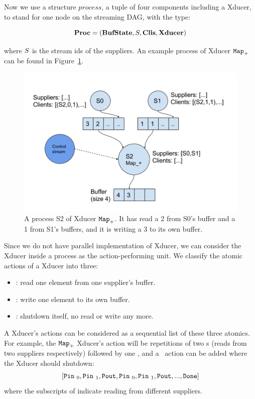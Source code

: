 Now we use a structure $process$, a tuple of four components including a Xducer, to stand for one node on the streaming DAG, with the type:

$$ \proc  =  (\bufst, \S, \clis, \xducer) $$

where $\S$ is the stream ids of the suppliers. An example process of Xducer $\map{+}$ can be found in Figure~\ref{fig:process}.

\begin{figure}
	\centering
	\includegraphics[width=1.0\textwidth]{process2}
	\caption{A process S2 of Xducer $\map{+}$. It has read a 2 from S0's buffer and a 1 from S1's buffers, and it is writing a 3 to its own buffer.}
	\label{fig:process}
\end{figure}

Since we do not have parallel implementation of Xducer, we can consider the Xducer inside a process as the action-performing unit. 
We classify the atomic actions of a Xducer into three:
\begin{itemize}
	\item \pin: read one element from one supplier's buffer.
	\item \pout : write one element to its own buffer.
	\item \done: shutdown itself, no read or write any more.
\end{itemize}

A Xducer's actions can be considered as a sequential list of these three atomics.
For example,  the $\map{+}$ Xducer's action will be repetitions of two \pin s (reads from two suppliers respectively) followed by one \pout, and 
a \done \ action can be added where the Xducer should shutdown:
$$[\pin_0, \pin_1, \pout, \pin_0, \pin_1, \pout,... ,\done]$$
 where the subscripts of \pin indicate reading from different suppliers.


